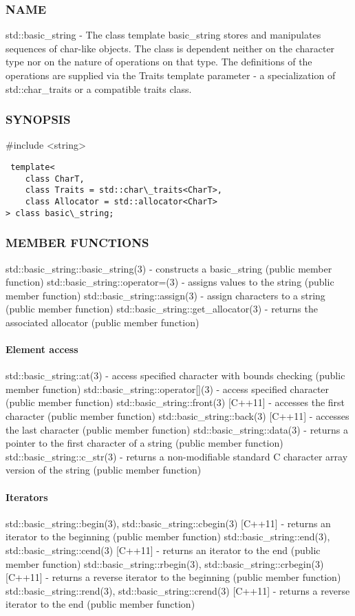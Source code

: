 \subsubsection{NAME}
std::basic\_string - The class template basic\_string stores and manipulates sequences of char-like objects. The class is dependent neither on the character type nor on the nature of operations on that type. The definitions of the operations are supplied via the Traits template parameter - a specialization of std::char\_traits or a compatible traits class.

\subsubsection{SYNOPSIS}
\#include <string>

\begin{lstlisting}
 template<
    class CharT,
    class Traits = std::char\_traits<CharT>,
    class Allocator = std::allocator<CharT>
> class basic\_string;
\end{lstlisting}

\subsubsection{MEMBER FUNCTIONS}
std::basic\_string::basic\_string(3) - constructs a basic\_string  (public member function)
std::basic\_string::operator=(3) - assigns values to the string   (public member function)
std::basic\_string::assign(3) - assign characters to a string  (public member function)
std::basic\_string::get\_allocator(3) - returns the associated allocator   (public member function)
\paragraph{Element access}
std::basic\_string::at(3) - access specified character with bounds checking  (public member function)
std::basic\_string::operator[](3) - access specified character  (public member function)
std::basic\_string::front(3) [C++11] - accesses the first character  (public member function)
std::basic\_string::back(3) [C++11] - accesses the last character  (public member function)
std::basic\_string::data(3) - returns a pointer to the first character of a string  (public member function)
std::basic\_string::c\_str(3) - returns a non-modifiable standard C character array version of the string  (public member function)
\paragraph{Iterators}
std::basic\_string::begin(3), std::basic\_string::cbegin(3) [C++11] - returns an iterator to the beginning   (public member function)
std::basic\_string::end(3), std::basic\_string::cend(3) [C++11] - returns an iterator to the end   (public member function)
std::basic\_string::rbegin(3), std::basic\_string::crbegin(3) [C++11] - returns a reverse iterator to the beginning   (public member function)
std::basic\_string::rend(3), std::basic\_string::crend(3) [C++11] - returns a reverse iterator to the end   (public member function)
